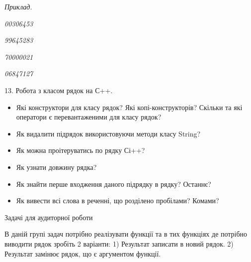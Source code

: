 \documentclass[]{article}
\makeatletter
\newcommand{\xslalph}[1]{\expandafter\@xslalph\csname c@#1\endcsname}
\newcommand{\@xslalph}[1]{%
    \ifcase#1\or а\or б\or в\or г\or д\or e\or є\or ж\or з\or i%
    \or й\or к\or л\or м\or н\or о\or п\or р\or с\or т%
    \or у\or ф\or х\or ц\or ч\or ш\or ю\or я\or аа\or бб\or вв%
    \else\@ctrerr\fi%
}
\makeatother
\begin{document}
\begin{enumerate}
\begin{enumerate}[label=\xslalph*)]
\begin{enumerate}
\begin{enumerate}[label=\xslalph*)]
\emph{Приклад.}

\emph{00306453 }

\emph{99645283 }

\emph{70000021 }

\emph{06847127 }

13. Робота з класом рядок на С++.

\begin{itemize}

\item
  Які конструктори для класу рядок? Які копі-конструкторів? Скільки та
  які оператори є перевантаженими для класу рядок?
\item
  Як видалити підрядок використовуючи методи класу String?
\item
  Як можна проітеруватись по рядку Сі++?
\item
  Як узнати довжину рядка?
\item
  Як знайти перше входження даного підрядку в рядку? Останнє?
\item
  Як вивести всі слова в реченні, що розділено пробілами? Комами?
\end{itemize}

Задачі для аудиторної роботи

В даній групі задач потрібно реалізувати функції та в тих функціях де
потрібно виводити рядок зробіть 2 варіанти: 1) Результат записати в
новий рядок. 2) Результат замінює рядок, що є аргументом функції.


\end{enumerate}
\end{enumerate}
\end{enumerate}
\end{enumerate}
\end{document}
